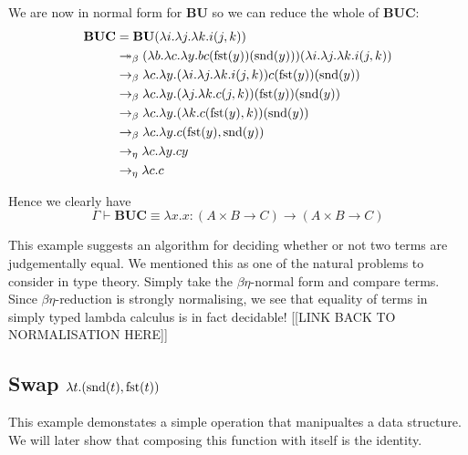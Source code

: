 \begin{example}
    We are now in normal form for $\mathbf{B} \mathbf{U}$ so we can reduce the whole of $\mathbf{B} \mathbf{U} \mathbf{C}$:
    \begin{equation*}
        \begin{aligned}
            \mathbf{B} \mathbf{U} \mathbf{C} &= \mathbf{B} \mathbf{U} (\lambda i . \lambda j . \lambda k . i (j , k)) \\
            &\twoheadrightarrow_{\beta} (\lambda b . \lambda c . \lambda y. b c(\mathrm{fst}(y))(\mathrm{snd}(y))) (\lambda i . \lambda j . \lambda k . i (j , k)) \\
            &\to_{\beta} \lambda c . \lambda y.  (\lambda i . \lambda j . \lambda k . i (j , k)) c(\mathrm{fst}(y))(\mathrm{snd}(y)) \\
            &\to_{\beta} \lambda c . \lambda y.  (\lambda j . \lambda k . c (j , k)) (\mathrm{fst}(y))(\mathrm{snd}(y)) \\
            &\to_{\beta} \lambda c . \lambda y.  (\lambda k . c (\mathrm{fst}(y) , k)) (\mathrm{snd}(y)) \\
            &\to_{\beta} \lambda c . \lambda y.  c (\mathrm{fst}(y) , \mathrm{snd}(y))  \\
            &\to_{\eta} \lambda c . \lambda y . c y \\
            &\to_{\eta} \lambda c . c
        \end{aligned}
    \end{equation*}
    
    Hence we clearly have
    $$
        \Gamma \vdash \mathbf{B} \mathbf{U} \mathbf{C} \equiv \lambda x . x : (A \times B \to C) \to (A \times B \to C)
    $$
\end{example}

\begin{remark}
    This example suggests an algorithm for deciding whether or not two terms are judgementally equal. 
    We mentioned this as one of the natural problems to consider in type theory.
    Simply take the $\beta \eta$-normal form and compare terms. Since $\beta \eta$-reduction is strongly normalising, we see that equality of terms in simply typed lambda calculus is in fact decidable! [[LINK BACK TO NORMALISATION HERE]]
\end{remark}

\subsection{Swap \texorpdfstring{$\lambda t . (\mathrm{snd}(t), \mathrm{fst}(t))$}{}}

This example demonstates a simple operation that manipualtes a data structure. We will later show that composing this function with itself is the identity.

